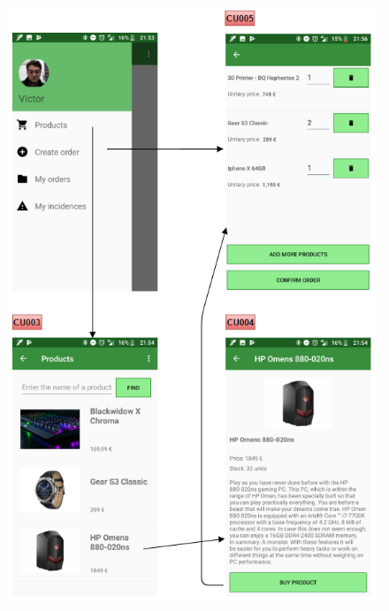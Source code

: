 \documentclass[11pt,spanish,listoffigures]{tfgetsinf}
\begin{document}
\begin{figure}[h]
\centering
\includegraphics[scale=1.2]{ModeloUI_Final3}
\end{figure}
\end{document}
